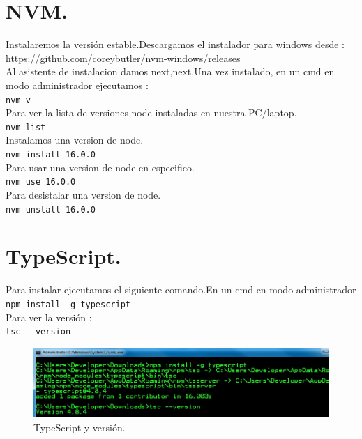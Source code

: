 \section{NVM.}
Instalaremos la versi\'on estable.Descargamos el instalador para windows desde :\\
\url{https://github.com/coreybutler/nvm-windows/releases}\\
Al asistente de instalacion damos next,next.Una vez instalado, en un cmd en modo administrador ejecutamos :\\
\texttt{nvm v}\\
Para ver la lista de versiones node instaladas en nuestra PC/laptop.\\
\texttt{nvm list}\\
Instalamos una version de node.\\
\texttt{nvm install 16.0.0}\\
Para usar una version de node en especifico.\\
\texttt{nvm use 16.0.0}\\
Para desistalar una version de node.\\
\texttt{nvm unstall 16.0.0}\\

\section{TypeScript.}
Para instalar ejecutamos el siguiente comando.En un cmd en modo administrador\\
\texttt{npm install -g typescript}\\
Para ver la versi\'on :\\
\texttt{tsc -- version}\\
\begin{figure}[H] %
	\centering %
	\includegraphics[scale=0.7]{images/c1_3.jpg}
	\caption{TypeScript y versi\'on.}
\end{figure}

